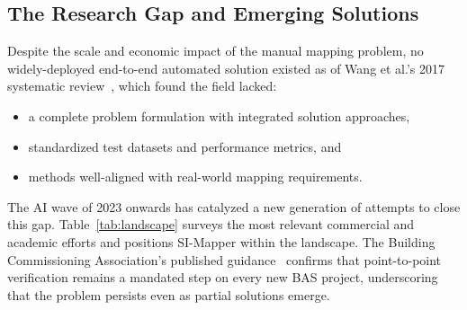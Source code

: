\subsection{The Research Gap and Emerging Solutions}
\label{subsec:research-gap}

Despite the scale and economic impact of the manual mapping problem, no widely-deployed end-to-end
automated solution existed as of Wang et al.'s 2017 systematic review~\cite{Wang2017}, which found
the field lacked:
\begin{itemize}[leftmargin=*, itemsep=2pt]
  \item a complete problem formulation with integrated solution approaches,
  \item standardized test datasets and performance metrics, and
  \item methods well-aligned with real-world mapping requirements.
\end{itemize}

The AI wave of 2023 onwards has catalyzed a new generation of attempts to close this gap.
Table~\ref{tab:landscape} surveys the most relevant commercial and academic efforts and positions
SI-Mapper within the landscape.
The Building Commissioning Association's published guidance~\cite{BCA2024} confirms that
point-to-point verification remains a mandated step on every new BAS project, underscoring that the
problem persists even as partial solutions emerge.

